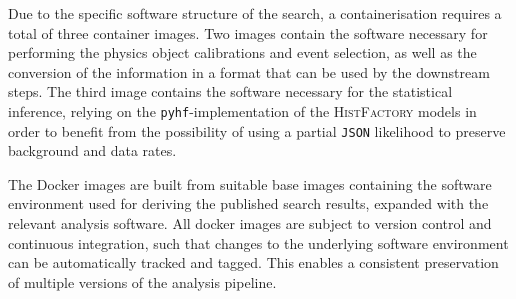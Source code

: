 Due to the specific software structure of the \onelepton search, a containerisation requires a total of three container images.
Two images contain the software necessary for performing the physics object calibrations and event selection, as well as the conversion of the information in a format that can be used by the downstream steps. The third image contains the software necessary for the statistical inference, relying on the \texttt{pyhf}-implementation of the \textsc{HistFactory} models in order to benefit from the possibility of using a partial \texttt{JSON} likelihood to preserve background and data rates.
%  

The Docker images are built from suitable base images containing the software environment used for deriving the published \onelepton search results, expanded with the relevant analysis software. All docker images are subject to version control and continuous integration, such that changes to the underlying software environment can be automatically tracked and tagged. This enables a consistent preservation of multiple versions of the analysis pipeline. 


